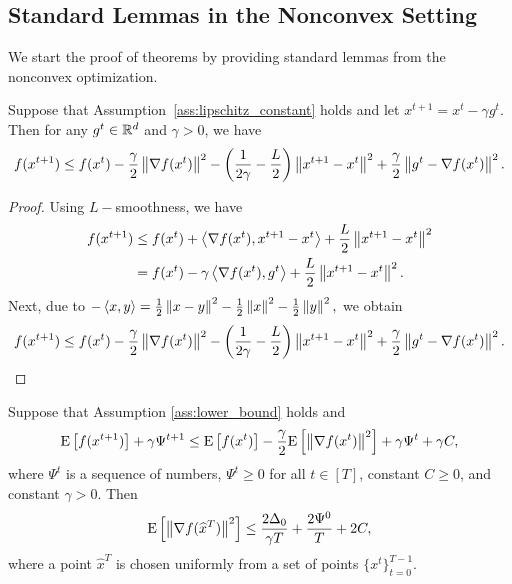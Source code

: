 \documentclass{article}
\begin{document}
\subsection{Standard Lemmas in the Nonconvex Setting}

We start the proof of theorems by providing standard lemmas from the nonconvex optimization.

\begin{lemma}
  \label{lemma:page_lemma}
  Suppose that Assumption~\ref{ass:lipschitz_constant} holds and let $x^{t+1} = x^{t} - \gamma g^{t}$. Then for any $g^{t} \in \mathbb{R}^d$ and $\gamma > 0$, we have
  \begin{eqnarray}
    \label{eq:page_lemma}
    f(x^{t + 1}) \leq f(x^t) - \frac{\gamma}{2}\left\| \nabla f(x^t) \right\|^2 - \left(\frac{1}{2\gamma} - \frac{L}{2}\right)
    \left\| x^{t+1} - x^t \right\|^2 + \frac{\gamma}{2}\left\| g^{t} - \nabla f(x^t) \right\|^2.
  \end{eqnarray}
\end{lemma}

\begin{proof}
  Using $L-$smoothness, we have 
  \begin{align*}
    f(x^{t+1}) &\leq f(x^t) + \left\langle\nabla f(x^t),x^{t+1} - x^{t}\right\rangle + \frac{L}{2} \left\| x^{t+1} - x^{t} \right\|^2 \\
    &= f(x^t) - \gamma \left\langle\nabla f(x^t),g^t\right\rangle + \frac{L}{2} \left\| x^{t+1} - x^{t} \right\|^2.
  \end{align*}
  Next, due to $-\left\langle x,y\right\rangle = \frac{1}{2}\left\| x - y \right\|^2 - \frac{1}{2}\left\| x \right\|^2 - \frac{1}{2}\left\| y \right\|^2,$ we obtain 
  \begin{align*}
    f(x^{t+1}) \leq f(x^t) -\frac{\gamma}{2} \left\| \nabla f(x^t) \right\|^2 - \left(\frac{1}{2\gamma} - \frac{L}{2}\right) \left\| x^{t+1} - x^{t} \right\|^2 + \frac{\gamma}{2}\left\| g^t - \nabla f(x^t) \right\|^2.
  \end{align*}
\end{proof}

\begin{lemma}
  \label{lemma:good_recursion}
  Suppose that Assumption \ref{ass:lower_bound} holds and
  \begin{align*}
      {\rm E}\left[f(x^{t+1})\right] + \gamma \Psi^{t+1} \leq {\rm E}\left[f(x^t)\right] - \frac{\gamma}{2}{\rm E}\left[\left\| \nabla f(x^t) \right\|^2\right] + \gamma \Psi^{t} + \gamma C,
  \end{align*}
  where $\Psi^{t}$ is a sequence of numbers, $\Psi^{t} \geq 0$ for all $t \in [T]$, constant $C \geq 0$, and constant $\gamma > 0.$ Then 
  \begin{align}
      \label{eq:good_recursion}
      {\rm E}\left[\left\| \nabla f(\widehat{x}^T) \right\|^2\right] \leq \frac{2 \Delta_0}{\gamma T} + \frac{2\Psi^{0}}{T} + 2 C,
  \end{align}
  where a point $\widehat{x}^T$ is chosen uniformly from a set of points $\{x^t\}_{t=0}^{T-1}.$
\end{lemma}
\end{document}

